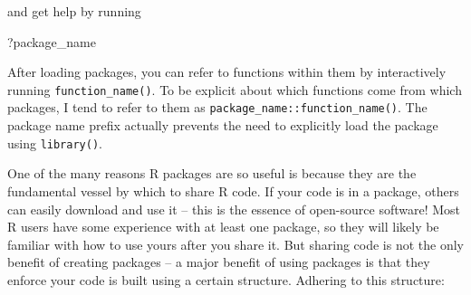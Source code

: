 \documentclass[
]{book}
\newenvironment{Shaded}{\begin{snugshade}}{\end{snugshade}}
\newcommand{\NormalTok}[1]{#1}
\begin{document}
and get help by running

\begin{Shaded}
\begin{Highlighting}[]
\NormalTok{?package_name}
\end{Highlighting}
\end{Shaded}

After loading packages, you can refer to functions within them by interactively running \texttt{function\_name()}. To be explicit about which functions come from which packages, I tend to refer to them as \texttt{package\_name::function\_name()}. The package name prefix actually prevents the need to explicitly load the package using \texttt{library()}.

One of the many reasons R packages are so useful is because they are the fundamental vessel by which to share R code. If your code is in a package, others can easily download and use it -- this is the essence of open-source software! Most R users have some experience with at least one package, so they will likely be familiar with how to use yours after you share it. But sharing code is not the only benefit of creating packages -- a major benefit of using packages is that they enforce your code is built using a certain structure. Adhering to this structure:
\end{document}
